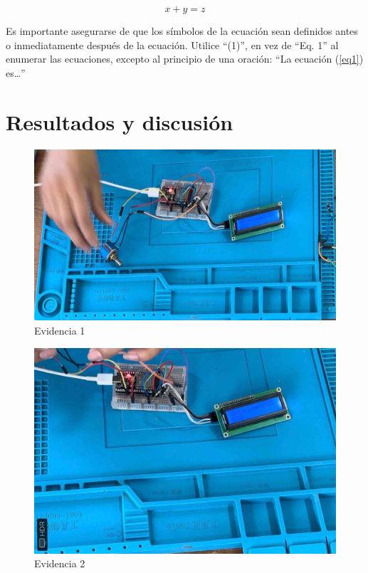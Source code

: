     \begin{equation}
        \label{eq1}
        x + y = z 
    \end{equation}
    
    Es importante asegurarse de que los símbolos de la ecuación sean definidos antes o inmediatamente después de la ecuación. Utilice “(1)”, en vez de “Eq. 1” al enumerar las ecuaciones, excepto al principio de una oración: “La ecuación (\ref{eq1}) es…”
    
    \section{Resultados y discusión}
    
    \begin{figure}[H]
        \centering
        \includegraphics[trim = {0mm 0mm 0mm 0mm},clip,scale=0.2]{8/Img/Evidencia 1.pdf}
        \caption{Evidencia 1}
        \label{Evidencia 1}
    \end{figure}
    
    \begin{figure}[H]
        \centering
        \includegraphics[trim = {0mm 0mm 0mm 0mm},clip,scale=0.2]{8/Img/Evidencia 2.pdf}
        \caption{Evidencia 2}
        \label{Evidencia 2}
    \end{figure}
    
